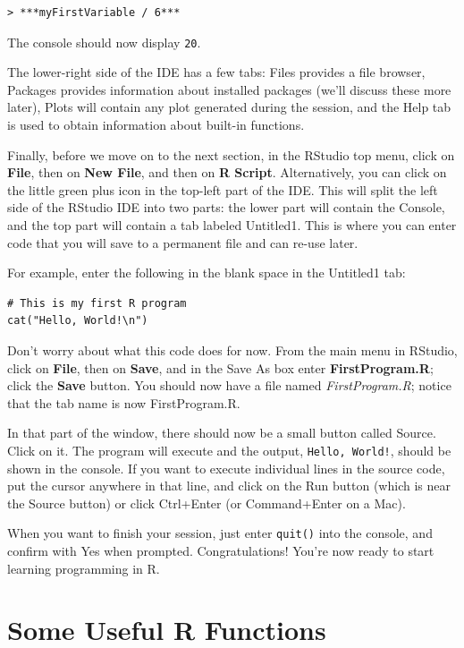 \begin{lstlisting}
> ***myFirstVariable / 6***
\end{lstlisting}

The console should now display \lstinline{20}.

The lower-right side of the IDE has a few tabs: Files provides a file browser,
Packages provides information about installed packages (we'll discuss these
more later), Plots will contain any plot generated during the \R session, and
the Help tab is used to obtain information about built-in functions.

Finally, before we move on to the next section, in the RStudio top menu, click
on \textbf{File}, then on \textbf{New File}, and then on \textbf{R Script}. 
Alternatively, you can click on the little green plus icon in the top-left part of the IDE.
This will split the left side of the RStudio IDE into two parts: the lower part will
contain the Console, and the top part will contain a tab labeled Untitled1.
This is where you can enter \R code that you will save to a permanent file
and can re-use later.

For example, enter the following in the blank space in the Untitled1 tab:

\begin{lstlisting}
# This is my first R program
cat("Hello, World!\n")
\end{lstlisting}

Don't worry about what this code does for now. From the main menu in RStudio,
click on \textbf{File}, then on \textbf{Save}, and in the Save As box enter 
\textbf{FirstProgram.R}; click the \textbf{Save} button. You should now have a file
named \emph{FirstProgram.R}; notice that the tab name is now FirstProgram.R.


In that part of the window, there should now be a small button called Source.
Click on it. The program will execute and the output, \lstinline{Hello, World!},
should be shown in the console. If you want to execute individual lines in the
source code, put the cursor anywhere in that line, and click on the Run button
(which is near the Source button) or click Ctrl+Enter (or Command+Enter on a Mac). 


When you want to finish your \R session, just enter \lstinline{quit()}
into the console, and confirm with Yes when prompted.
Congratulations! You're now ready to start learning programming in R.


\section{Some Useful R Functions}

